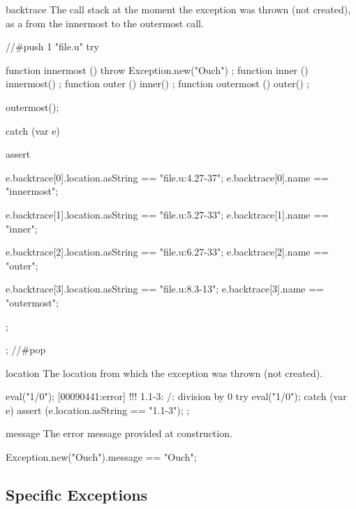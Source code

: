 \begin{urbiscriptapi}
\item[backtrace] The call stack at the moment the exception was thrown
  (not created), as a  from the innermost to the
  outermost call.
\begin{urbiscript}
//#push 1 "file.u"
try
{
  function innermost () { throw Exception.new("Ouch") };
  function inner     () { innermost() };
  function outer     () { inner() };
  function outermost () { outer() };

  outermost();
}
catch (var e)
{
  assert
  {
    e.backtrace[0].location.asString == "file.u:4.27-37";
    e.backtrace[0].name == "innermost";

    e.backtrace[1].location.asString == "file.u:5.27-33";
    e.backtrace[1].name == "inner";

    e.backtrace[2].location.asString == "file.u:6.27-33";
    e.backtrace[2].name == "outer";

    e.backtrace[3].location.asString == "file.u:8.3-13";
    e.backtrace[3].name == "outermost";
  };
};
//#pop
\end{urbiscript}

\item[location] The location from which the exception was thrown (not
  created).
\begin{urbiscript}
eval("1/0");
[00090441:error] !!! 1.1-3: /: division by 0
try
{
  eval("1/0");
}
catch (var e)
{
  assert (e.location.asString == "1.1-3");
};
\end{urbiscript}

\item[message] The error message provided at construction.
\begin{urbiassert}
Exception.new("Ouch").message == "Ouch";
\end{urbiassert}
\end{urbiscriptapi}

\subsection{Specific Exceptions}
\label{sec:specs:except:sub}

